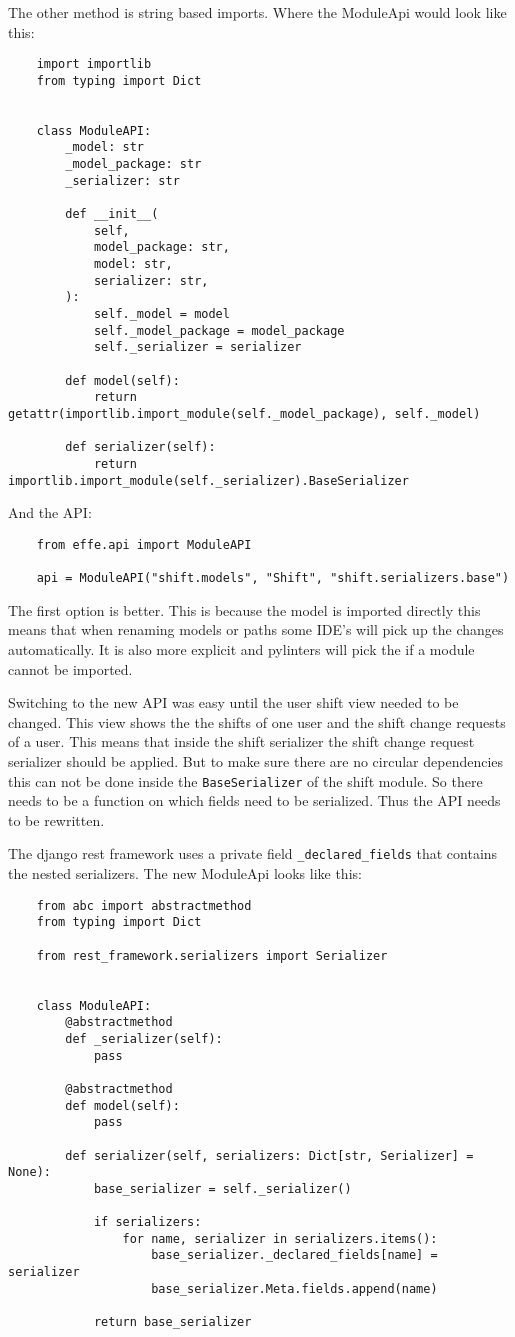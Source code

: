 The other method is string based imports. Where the ModuleApi would look like this:
\begin{verbatim}
    import importlib
    from typing import Dict


    class ModuleAPI:
        _model: str
        _model_package: str
        _serializer: str

        def __init__(
            self,
            model_package: str,
            model: str,
            serializer: str,
        ):
            self._model = model
            self._model_package = model_package
            self._serializer = serializer

        def model(self):
            return getattr(importlib.import_module(self._model_package), self._model)

        def serializer(self):
            return importlib.import_module(self._serializer).BaseSerializer
\end{verbatim}

And the API:
\begin{verbatim}
    from effe.api import ModuleAPI

    api = ModuleAPI("shift.models", "Shift", "shift.serializers.base")
\end{verbatim}

The first option is better. This is because the model is imported directly this means that when renaming models or paths some IDE's will pick up the changes automatically. It is also more explicit and pylinters will pick the if a module cannot be imported.

Switching to the new API was easy until the user shift view needed to be changed. This view shows the the shifts of one user and the shift change requests of a user. This means that inside the shift serializer the shift change request serializer should be applied. But to make sure there are no circular dependencies this can not be done inside the \texttt{BaseSerializer} of the shift module. So there needs to be a function on which fields need to be serialized. Thus the API needs to be rewritten.

The django rest framework uses a private field \texttt{\_declared\_fields} that contains the nested serializers. The new ModuleApi looks like this:
\begin{verbatim}
    from abc import abstractmethod
    from typing import Dict

    from rest_framework.serializers import Serializer


    class ModuleAPI:
        @abstractmethod
        def _serializer(self):
            pass

        @abstractmethod
        def model(self):
            pass

        def serializer(self, serializers: Dict[str, Serializer] = None):
            base_serializer = self._serializer()

            if serializers:
                for name, serializer in serializers.items():
                    base_serializer._declared_fields[name] = serializer
                    base_serializer.Meta.fields.append(name)

            return base_serializer
\end{verbatim}


